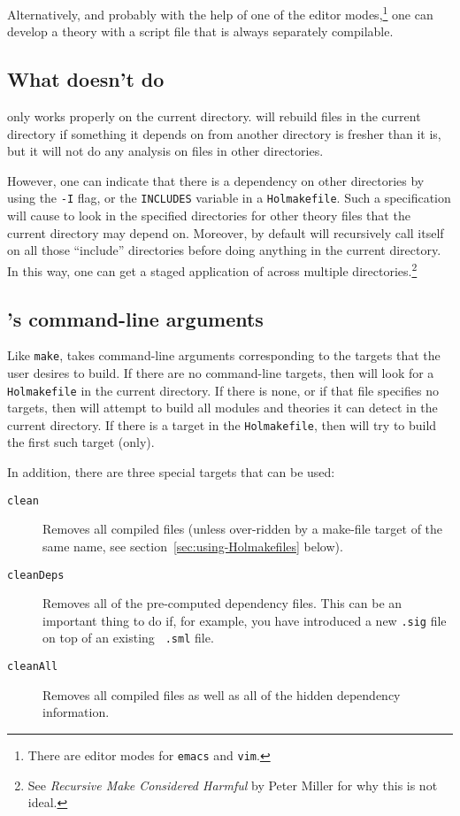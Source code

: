 Alternatively, and probably with the help of one of the editor modes,\footnote{There are editor modes for \texttt{emacs} and \texttt{vim}.} one can develop a theory with a script file that is always separately compilable.

\subsection{What \holmake{} doesn't do}

\holmake{} only works properly on the current directory.
\holmake{} will rebuild files in the current directory if something it depends on from another directory is fresher than it is, but it will not do any analysis on files in other directories.

%
However, one can indicate that there is a dependency on other directories by using the \texttt{-I} flag, or the \texttt{INCLUDES} variable in a \texttt{Holmakefile}.
Such a specification will cause \holmake{} to look in the specified directories for other theory files that the current directory may depend on.
Moreover, by default \holmake{} will recursively call itself on all those ``include'' directories before doing anything in the current directory.
In this way, one can get a staged application of \holmake{} across multiple directories.\footnote{See \emph{Recursive Make Considered
    Harmful} by Peter Miller for why this is not ideal.}

\subsection{\holmake{}'s command-line arguments}
Like {\tt make}, \holmake{} takes command-line arguments corresponding to the targets that the user desires to build.
If there are no command-line targets, then \holmake{} will look for a \texttt{Holmakefile} in the current directory.
If there is none, or if that file specifies no targets, then \holmake{} will attempt to build all \ML{} modules and \HOL{} theories it can detect in the current directory.
If there is a target in the \texttt{Holmakefile}, then \holmake{} will try to build the first such target (only).

In addition, there are three special targets that can be used:
\begin{description}
\item[{\tt clean}] Removes all compiled files (unless over-ridden by a
  make-file target of the same name, see
  section~\ref{sec:using-Holmakefiles} below).
\item [{\tt cleanDeps}] Removes all of the pre-computed dependency
  files.  This can be an important thing to do if, for example, you
  have introduced a new {\tt .sig} file on top of an existing {\tt
    .sml} file.
\item [{\tt cleanAll}] Removes all compiled files as well as all of
  the hidden dependency information.
\end{description}

